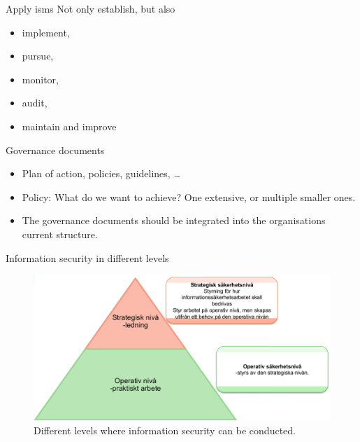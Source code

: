 \documentclass{beamer}
\begin{document}
\begin{frame}{Apply \ac{isms}}
  Not only establish, but also
  \begin{itemize}
    \item implement,
    \item pursue,
    \item monitor,
    \item audit,
    \item maintain and improve
  \end{itemize}
\end{frame}

\begin{frame}{Governance documents}
  \begin{itemize}
    \item Plan of action, policies, guidelines, \dots

    \item Policy: What do we want to achieve?
      One extensive, or multiple smaller ones.

    \item The governance documents should be integrated into the organisations
      current structure.

  \end{itemize}
\end{frame}

\begin{frame}{Information security in different levels}
  \begin{figure}
    \includegraphics[width=\textwidth]{infosak-levels.png}
    \caption{Different levels where information security can be conducted.}
  \end{figure}
\end{frame}
\end{document}
